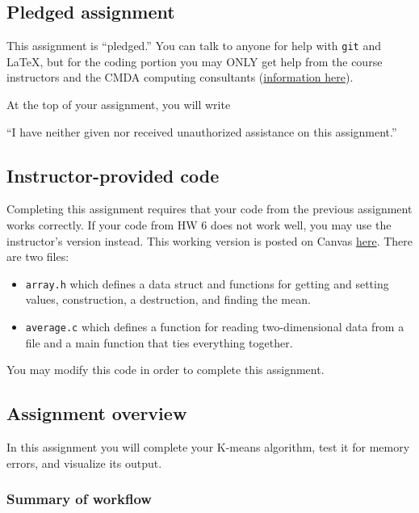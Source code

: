 
\subsection*{Pledged assignment}
This assignment is ``pledged.''
You can talk to anyone for help with \texttt{git} and \LaTeX{},
but for the coding portion you may ONLY get help from
the course instructors and the CMDA computing consultants (\href{https://www.ais.science.vt.edu/cmda/our-program/cmdacomputingconsultants.html}{information here}).

\vspace{8pt}\noindent At the top of your assignment, you will write
\begin{center}
``I have neither given nor received unauthorized assistance on this assignment.''
\end{center}

\subsection*{Instructor-provided code}
\begin{tcolorbox}[width=\textwidth,colback=green]
Completing this assignment requires that your code from the previous assignment works correctly.
If your code from HW 6 does not work well,
you may use the instructor's version instead.
This working version is posted on Canvas \href{https://canvas.vt.edu/courses/95914/files/folder/Homework/HW06\%20example}{here}.
There are two files:
\begin{itemize}
    \item \texttt{array.h} which defines a data struct and functions for getting and setting values, construction, a destruction, and finding the mean.
    \item \texttt{average.c} which defines a function for reading two-dimensional data from a file and a main function that ties everything together.
\end{itemize}
You may modify this code in order to complete this assignment.
\end{tcolorbox}

\subsection*{Assignment overview}
\vspace{8pt}\noindent In this assignment you will complete your K-means algorithm, test it for memory errors, and visualize its output.


\subsubsection*{Summary of workflow}

